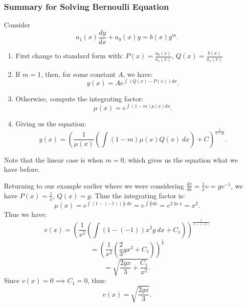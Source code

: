 \documentclass[../main/main.tex]{subfiles}
\begin{document}
\subsubsection{Summary for Solving Bernoulli Equation}
Consider \[
	a_1(x) \frac{dy}{dx}+a_0(x)y=b(x) y^{m}
.\] 
\begin{enumerate}
	\item First change to standard form with: $P(x) = \frac{a_0(x)}{a_1(x)}$, $Q(x) =\frac{b(x)}{a_1(x)}$
	\item If $m=1$, then, for some constant $A$, we have: \[
			y(x) = Ae^{\int (Q(x)-P(x))dx}
	.\] 
\item Otherwise, compute the integrating factor: \[
		\mu(x) = e^{\int(1-m)p(x)dx}
.\] 
\item Giving us the equation: \[
		y(x) = \left( \frac{1}{\mu(x)}\left( \int (1-m) \mu(x) Q(x)~dx \right) +C \right) ^{\frac{1}{1-m}}
.\] 
\end{enumerate}
\begin{remark}
	Note that the linear case is when $m=0$, which gives us the equation what we have before.
\end{remark}
\begin{example}
	Returning to our example earlier where we were considering $\frac{dv}{dx}=\frac{1}{x}v=gv^{-1}$, we have $P(x) = \frac{1}{x}$, $Q(x) = g$. Thus the integrating factor is:  \[
		\mu(x) = e^{\int (1-(-1))\frac{1}{x}~dx} = e^{\int \frac{2}{x}dx} = e^{2\ln x} = x^2
	.\] 
	Thus we have: \[
		v(x) = \left( \frac{1}{x^2}\left( \int(1-(-1))x^2 g~dx + C_1 \right)  \right) ^{\frac{1}{1-(-1)}}
	\] \[
	= \left( \frac{1}{x^2}\left( \frac{2}{3}gx^3+C_1 \right)  \right) ^{\frac{1}{2}}
	\] \[
	 = \sqrt{\frac{2gx}{3}+\frac{C_1}{x^2}} 
 .\]  Since $v(x) = 0 \implies C_1 = 0$, thus: \[
 v(x) = \sqrt{\frac{2gx}{3}} 
 .\] 
\end{example}
\end{document}
